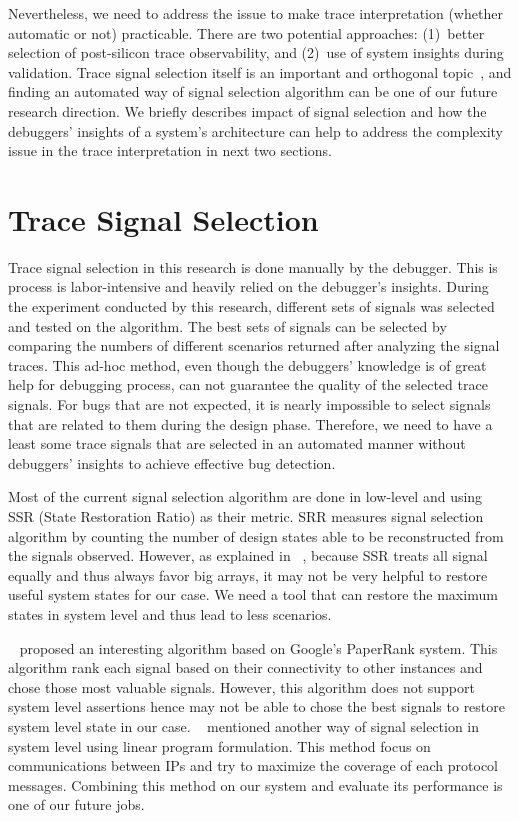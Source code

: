 \documentclass[12pt,frontmatter,copyright,thesis]{usfmanus}
\begin{document}
Nevertheless, we need to address the issue to make trace
interpretation (whether automatic or not) practicable.
There are two potential approaches: (1)~better selection of
post-silicon trace observability, and (2)~use of system
insights during validation. 
Trace signal selection itself
is an important and orthogonal topic~\cite{nicolici,basu},
and finding an automated way of signal selection algorithm can be one 
of our future research direction. We briefly describes impact of signal selection
and how the debuggers'
insights of a system's architecture can help to address the
complexity issue in the trace interpretation in next two sections.

\section{Trace Signal Selection}
Trace signal selection in this research is done manually by the debugger. 
This is process is labor-intensive and heavily relied on the debugger's insights.
During the experiment conducted by this research,
different sets of signals was selected and tested on the algorithm.
The best sets of signals can be selected
by comparing the numbers of different scenarios returned
after analyzing the signal traces.
This ad-hoc method, even though the debuggers' knowledge
is of great help for debugging process, 
can not guarantee the quality of the selected trace signals.
For bugs that are not expected, it is nearly impossible to select
signals that are related to them during the design phase.
Therefore, we need to have a least some trace signals
that are selected in an automated manner without
debuggers' insights to achieve effective bug detection.
 
Most of the current signal selection algorithm are done in low-level and using 
SSR (State Restoration Ratio)  as 
their metric. 
SRR measures signal selection algorithm by counting
the number of design states able to be reconstructed
 from the signals observed. 
However, as explained in 
 ~\cite{forestMa}, because SSR treats all signal equally and thus always favor big arrays,
 it may not be very helpful to restore useful system states for our case. We need a tool that can 
 restore the maximum states in system level and thus lead to less scenarios.
 
 ~\cite{forestMa} proposed an interesting algorithm based on Google's PaperRank system. 
 This algorithm rank each signal based on their connectivity to other instances and chose 
 those most valuable signals. However, this algorithm does not support system level assertions
 hence may not be able to chose the best signals to restore system level state in our case.
  ~\cite{signalselect} mentioned another way of 
signal selection in system level using linear program formulation. This method focus on communications
 between IPs and try to maximize the coverage of each protocol messages. Combining this method
 on our system and evaluate its performance is one of our future jobs.
\end{document}
